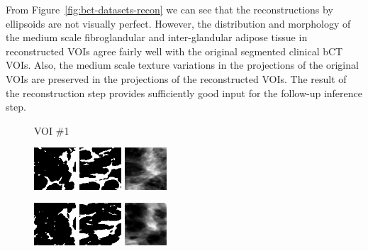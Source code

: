 \documentclass[journal]{IEEEtran}
\begin{document}
From Figure~\ref{fig:bct-datasets-recon} we can see that the
reconstructions by ellipsoids are not visually perfect. However, the
distribution and morphology of the medium scale fibroglandular and
inter-glandular adipose tissue in reconstructed VOIs agree fairly well
with the original segmented clinical bCT VOIs. Also, the medium scale
texture variations in the projections of the original VOIs are
preserved in the projections of the reconstructed VOIs. The result of
the reconstruction step provides sufficiently good input for the
follow-up inference step.

\begin{figure}[!htb]

  \centering \captionsetup[subfloat]{labelformat=empty}

  {\fontsize{9}{9}\selectfont VOI \#1} \vspace{1mm}

   \includegraphics[width=0.14\textwidth]
  {figure/all/dataset_3/roi_coronal}
  \includegraphics[width=0.14\textwidth]
  {figure/all/dataset_3/roi_saggital}
  \includegraphics[width=0.14\textwidth]
  {figure/all/dataset_3/proj_roi}

  \includegraphics[width=0.14\textwidth]
  {figure/all/dataset_3/model_coronal}
  \includegraphics[width=0.14\textwidth]
  {figure/all/dataset_3/model_saggital}
  \includegraphics[width=0.14\textwidth]
  {figure/all/dataset_3/proj_roi_inten10}


\end{figure}
\end{document}
